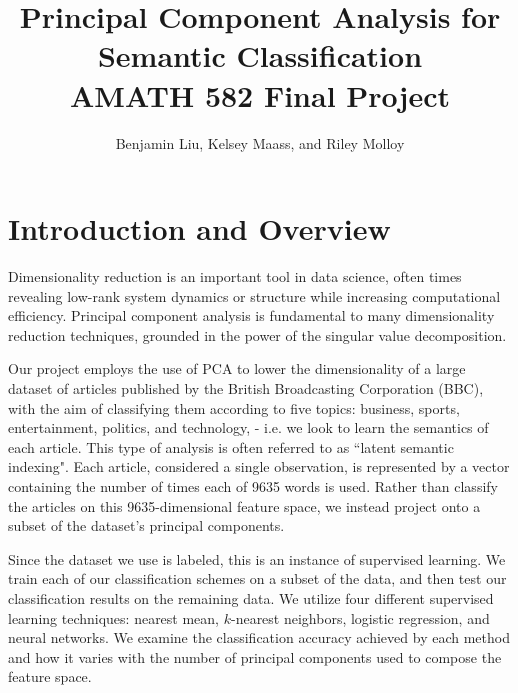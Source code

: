 \documentclass[12pt]{article}
\title{Principal Component Analysis for Semantic Classification \\ AMATH 582 Final Project}
\author{Benjamin Liu, Kelsey Maass, and Riley Molloy}
\begin{document}
\maketitle
\bigskip



\section{Introduction and Overview}
Dimensionality reduction is an important tool in data science, often times revealing low-rank system dynamics or structure while increasing computational efficiency. Principal component analysis is fundamental to many dimensionality reduction techniques, grounded in the power of the singular value decomposition. 

Our project employs the use of PCA to lower the dimensionality of a large dataset of articles published by the British Broadcasting Corporation (BBC), with the aim of classifying them according to five topics: business, sports, entertainment, politics, and technology, - i.e. we look to learn the semantics of each article. This type of analysis is often referred to as ``latent semantic indexing". Each article, considered a single observation, is represented by a vector containing the number of times each of 9635 words is used. Rather than classify the articles on this 9635-dimensional feature space, we instead project onto a subset of the dataset's principal components. 

Since the dataset we use is labeled, this is an instance of supervised learning. We train each of our classification schemes on a subset of the data, and then test our classification results on the remaining data. We utilize four different supervised learning techniques: nearest mean, $k$-nearest neighbors, logistic regression, and neural networks. We examine the classification accuracy achieved by each method and how it varies with the number of principal components used to compose the feature space.  
\end{document}
